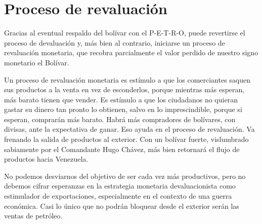 %
\section{Proceso de revaluación}
\label{sec:annexb}
%
Gracias al eventual respaldo del bolívar con el P-E-T-R-O, puede revertirse el proceso de devaluación y, más bien al contrario, iniciarse un proceso de revaluación monetaria, que recobra parcialmente el valor perdido de nuestro signo monetario el Bolívar.

Un proceso de revaluación monetaria es estímulo a que los comerciantes saquen sus productos a la venta en vez de esconderlos, porque mientras más esperan, más barato tienen que vender. Es estímulo a que los ciudadanos no quieran gastar su dinero tan pronto lo obtienen, salvo en lo imprescindible, porque si esperan, comprarán más barato. Habrá más compradores de bolívares, con divisas, ante la expectativa de ganar. Eso ayuda en el proceso de revaluación. Va frenando la salida de productos al exterior. Con un bolívar fuerte, vislumbrado sabiamente por el Comandante Hugo Chávez, más bien retornará el flujo de productos hacia Venezuela. 

No podemos desviarnos del objetivo de ser cada vez más productivos, pero no debemos cifrar esperanzas en la estrategia monetaria devaluacionista como estimulador de exportaciones, especialmente en el contexto de una guerra económica. Casi lo único que no podrán bloquear desde el exterior serán las ventas de petróleo.